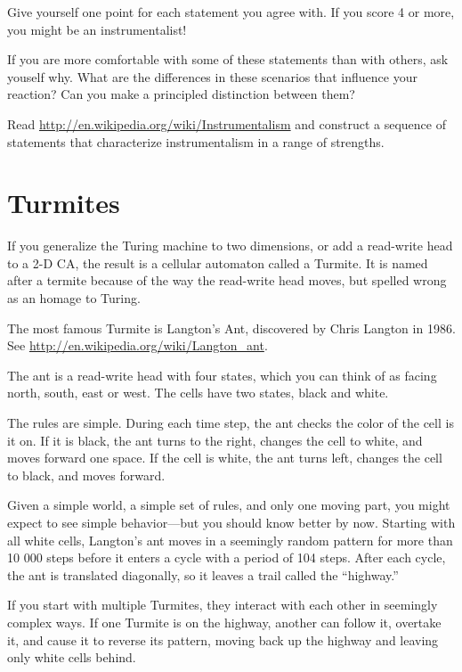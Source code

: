 \documentclass[10pt]{book}
\begin{document}
Give yourself one point for each statement you agree with.
If you score 4 or more, you might be an instrumentalist!

If you are more comfortable with some of these statements than with
others, ask youself why.  What are the differences in these
scenarios that influence your reaction?  Can you make
a principled distinction between them?

\begin{ex}

Read \url{http://en.wikipedia.org/wiki/Instrumentalism}
and construct a sequence
of statements that characterize instrumentalism in a range of
strengths.

\end{ex}


\section{Turmites}

If you generalize the Turing machine to two dimensions, or
add a read-write head to a 2-D CA, the result is a
cellular automaton called a Turmite.  It is named after a
termite because of the way the read-write head moves, but
spelled wrong as an homage to Turing. 

The most famous Turmite is Langton's Ant, discovered by Chris Langton
in 1986.  See \url{http://en.wikipedia.org/wiki/Langton_ant}.

The ant is a read-write head with
four states, which you can think of as facing north, south,
east or west.  The cells have two states, black and white.

The rules are simple.  During each time step, the ant checks the color
of the cell is it on.  If it is black, the ant turns to the right,
changes the cell to white, and moves forward one space.  If the cell
is white, the ant turns left, changes the cell to black, and moves
forward.

Given a simple world, a simple set of rules, and only one moving part,
you might expect to see simple behavior---but you should know
better by now.  Starting with all white cells, Langton's ant
moves in a seemingly random pattern for more than 10 000 steps
before it enters a cycle with a period of 104 steps.  After
each cycle, the ant is translated diagonally, so it leaves
a trail called the ``highway.''

If you start with multiple Turmites, they interact with each
other in seemingly complex ways.  If one Turmite is on the
highway, another can follow it, overtake it, and cause it to
reverse its pattern, moving back up the highway and leaving
only white cells behind.  
\end{document}
